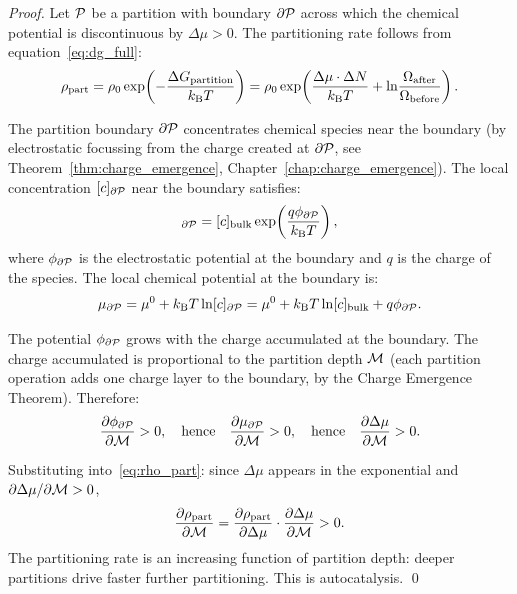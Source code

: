 \begin{proof}
Let $\mathcal{P}$ be a partition with boundary $\partial\mathcal{P}$ across which the
chemical potential is discontinuous by $\Delta\mu > 0$. The partitioning rate
follows from equation~\eqref{eq:dg_full}:
\begin{equation}
  \rho_{\mathrm{part}} = \rho_0 \exp\!\left(-\frac{\Delta G_{\mathrm{partition}}}{k_{\mathrm{B}} T}\right)
  = \rho_0 \exp\!\left(\frac{\Delta\mu \cdot \Delta N}{k_{\mathrm{B}} T}
    + \ln\!\frac{\Omega_{\mathrm{after}}}{\Omega_{\mathrm{before}}}\right).
  \label{eq:rho_part}
\end{equation}

The partition boundary $\partial\mathcal{P}$ concentrates chemical species
near the boundary (by electrostatic focussing from the charge created at
$\partial\mathcal{P}$, see Theorem~\ref{thm:charge_emergence}, Chapter~\ref{chap:charge_emergence}).
The local concentration $[c]_{\partial\mathcal{P}}$ near the boundary satisfies:
\begin{equation}
  [c]_{\partial\Part} = [c]_{\mathrm{bulk}} \exp\!\left(\frac{q\phi_{\partial\Part}}{\kB T}\right),
  \label{eq:concentration_enhancement}
\end{equation}
where $\phi_{\partial\mathcal{P}}$ is the electrostatic potential at the boundary
and $q$ is the charge of the species. The local chemical potential at the
boundary is:
\begin{equation}
  \mu_{\partial\mathcal{P}} = \mu^0 + k_{\mathrm{B}} T \ln[c]_{\partial\mathcal{P}}
  = \mu^0 + k_{\mathrm{B}} T \ln[c]_{\mathrm{bulk}} + q\phi_{\partial\mathcal{P}}.
\end{equation}

The potential $\phi_{\partial\mathcal{P}}$ grows with the charge accumulated at the
boundary. The charge accumulated is proportional to the partition depth $\mathcal{M}$
(each partition operation adds one charge layer to the boundary, by the Charge
Emergence Theorem). Therefore:
\begin{equation}
  \frac{\partial \phi_{\partial\mathcal{P}}}{\partial \mathcal{M}} > 0,
  \quad\text{hence}\quad
  \frac{\partial \mu_{\partial\mathcal{P}}}{\partial \mathcal{M}} > 0,
  \quad\text{hence}\quad
  \frac{\partial \Delta\mu}{\partial \mathcal{M}} > 0.
\end{equation}

Substituting into~\eqref{eq:rho_part}: since $\Delta\mu$ appears in the
exponential and $\partial\Delta\mu/\partial\mathcal{M} > 0$,
\begin{equation}
  \frac{\partial \rho_{\mathrm{part}}}{\partial \mathcal{M}}
  = \frac{\partial \rho_{\mathrm{part}}}{\partial \Delta\mu} \cdot \frac{\partial \Delta\mu}{\partial \mathcal{M}} > 0.
\end{equation}
The partitioning rate is an increasing function of partition depth: deeper
partitions drive faster further partitioning. This is autocatalysis. \qed
\end{proof}

